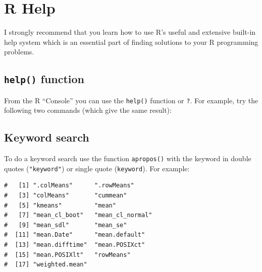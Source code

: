 \documentclass[a4paper,9pt,twocolumn,twoside,printwatermark=false]{pinp}
\begin{document}
\section{R Help}\label{r-help}

I strongly recommend that you learn how to use R's useful and extensive
built-in help system which is an essential part of finding solutions to
your R programming problems.

\subsection{\texorpdfstring{\texttt{help()}
function}{help() function}}\label{help-function}

From the R ``Console'' you can use the \texttt{help()} function or
\texttt{?}. For example, try the following two commands (which give the
same result):

\begin{Shaded}
\begin{Highlighting}[]
\end{Highlighting}
\end{Shaded}

\subsection{Keyword search}\label{keyword-search}

To do a keyword search use the function \texttt{apropos()} with the
keyword in double quotes (\texttt{"keyword"}) or single quote
(\texttt{\textquotesingle{}keyword\textquotesingle{}}). For example:

\begin{Shaded}
\begin{Highlighting}[]
\NormalTok{(}\NormalTok{)}
\end{Highlighting}
\end{Shaded}

\begin{ShadedResult}
\begin{verbatim}
#   [1] ".colMeans"      ".rowMeans"     
#   [3] "colMeans"       "cummean"       
#   [5] "kmeans"         "mean"          
#   [7] "mean_cl_boot"   "mean_cl_normal"
#   [9] "mean_sdl"       "mean_se"       
#  [11] "mean.Date"      "mean.default"  
#  [13] "mean.difftime"  "mean.POSIXct"  
#  [15] "mean.POSIXlt"   "rowMeans"      
#  [17] "weighted.mean"
\end{verbatim}
\end{ShadedResult}
\end{document}
